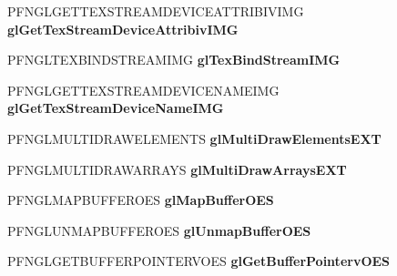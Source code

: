 \begin{DoxyCompactItemize}
\item 
\hypertarget{class_c_p_v_r_tgles_ext_a54dc5ade8e4917fbbf3e151536b453d4}{P\+F\+N\+G\+L\+G\+E\+T\+T\+E\+X\+S\+T\+R\+E\+A\+M\+D\+E\+V\+I\+C\+E\+A\+T\+T\+R\+I\+B\+I\+V\+I\+M\+G {\bfseries gl\+Get\+Tex\+Stream\+Device\+Attribiv\+I\+M\+G}}\label{class_c_p_v_r_tgles_ext_a54dc5ade8e4917fbbf3e151536b453d4}

\item 
\hypertarget{class_c_p_v_r_tgles_ext_ad6b32e9162fdb1ba0acc7520b3e8a75f}{P\+F\+N\+G\+L\+T\+E\+X\+B\+I\+N\+D\+S\+T\+R\+E\+A\+M\+I\+M\+G {\bfseries gl\+Tex\+Bind\+Stream\+I\+M\+G}}\label{class_c_p_v_r_tgles_ext_ad6b32e9162fdb1ba0acc7520b3e8a75f}

\item 
\hypertarget{class_c_p_v_r_tgles_ext_ab12fcbf175d856a72da1b705949d13b9}{P\+F\+N\+G\+L\+G\+E\+T\+T\+E\+X\+S\+T\+R\+E\+A\+M\+D\+E\+V\+I\+C\+E\+N\+A\+M\+E\+I\+M\+G {\bfseries gl\+Get\+Tex\+Stream\+Device\+Name\+I\+M\+G}}\label{class_c_p_v_r_tgles_ext_ab12fcbf175d856a72da1b705949d13b9}

\item 
\hypertarget{class_c_p_v_r_tgles_ext_a47e8f7404e5578613b7f1245cab0a309}{P\+F\+N\+G\+L\+M\+U\+L\+T\+I\+D\+R\+A\+W\+E\+L\+E\+M\+E\+N\+T\+S {\bfseries gl\+Multi\+Draw\+Elements\+E\+X\+T}}\label{class_c_p_v_r_tgles_ext_a47e8f7404e5578613b7f1245cab0a309}

\item 
\hypertarget{class_c_p_v_r_tgles_ext_a69b5ab6c33bf9d84951ff10f5c5cc26f}{P\+F\+N\+G\+L\+M\+U\+L\+T\+I\+D\+R\+A\+W\+A\+R\+R\+A\+Y\+S {\bfseries gl\+Multi\+Draw\+Arrays\+E\+X\+T}}\label{class_c_p_v_r_tgles_ext_a69b5ab6c33bf9d84951ff10f5c5cc26f}

\item 
\hypertarget{class_c_p_v_r_tgles_ext_a8c456bdf95f36f5607842473798fed54}{P\+F\+N\+G\+L\+M\+A\+P\+B\+U\+F\+F\+E\+R\+O\+E\+S {\bfseries gl\+Map\+Buffer\+O\+E\+S}}\label{class_c_p_v_r_tgles_ext_a8c456bdf95f36f5607842473798fed54}

\item 
\hypertarget{class_c_p_v_r_tgles_ext_a1a23617af2991aaf51d6910189127b0f}{P\+F\+N\+G\+L\+U\+N\+M\+A\+P\+B\+U\+F\+F\+E\+R\+O\+E\+S {\bfseries gl\+Unmap\+Buffer\+O\+E\+S}}\label{class_c_p_v_r_tgles_ext_a1a23617af2991aaf51d6910189127b0f}

\item 
\hypertarget{class_c_p_v_r_tgles_ext_a19911cafe241d0fd56ee42291c8e2aab}{P\+F\+N\+G\+L\+G\+E\+T\+B\+U\+F\+F\+E\+R\+P\+O\+I\+N\+T\+E\+R\+V\+O\+E\+S {\bfseries gl\+Get\+Buffer\+Pointerv\+O\+E\+S}}\label{class_c_p_v_r_tgles_ext_a19911cafe241d0fd56ee42291c8e2aab}


\end{DoxyCompactItemize}
